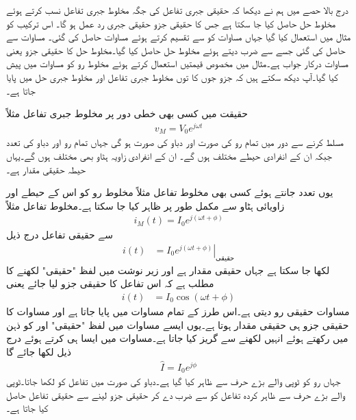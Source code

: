 درج بالا حصے میں ہم نے دیکھا کہ حقیقی جبری تفاعل کی جگہ مخلوط جبری تفاعل نسب کرتے ہوئے مخلوط حل حاصل کیا جا سکتا ہے جس کا حقیقی جزو حقیقی جبری رد عمل ہو گا۔ اس ترکیب کو مثال  میں استعمال کیا گیا جہاں مساوات  کو  سے تقسیم کرتے ہوئے مساوات  حاصل کی گئی۔ مساوات  سے  حاصل کی گئی جسے   سے ضرب دیتے ہوئے مخلوط حل حاصل کیا گیا۔مخلوط حل کا حقیقی جزو یعنی مساوات  درکار جواب ہے۔مثال  میں  مخصوص قیمتیں استعمال کرتے  ہوئے مخلوط رو کو مساوات   میں پیش کیا گیا۔آپ دیکھ سکتے ہیں کہ جزو   جوں کا توں مخلوط جبری تفاعل اور مخلوط جبری حل میں پایا جاتا ہے۔

حقیقت میں کسی بھی خطی دور پر مخلوط جبری تفاعل مثلاً
\begin{align}
v_M=V_0 e^{j \omega t}
\end{align}
مسلط کرنے سے دور میں تمام رو کی صورت  اور دباو کی صورت  ہو گی جہاں تمام رو اور دباو  کی تعدد  جبکہ ان کے انفرادی  حیطے مختلف ہوں گے۔ ان کے انفرادی زاویہ ہٹاو بھی مختلف ہوں گے۔یہاں حیطہ حقیقی مقدار ہے۔

یوں تعدد جانتے ہوئے کسی بھی مخلوط تفاعل مثلاً مخلوط رو کو اس کے حیطے  اور زاویائی ہٹاو  سے مکمل طور پر ظاہر کیا جا سکتا ہے۔مخلوط تفاعل مثلاً 
\begin{align}
i_M(t)=I_0 e^{j(\omega t+\phi)}
\end{align}
سے حقیقی تفاعل درج ذیل
\begin{align}\label{مساوات_بدلتا_حقیقی_رو_الف}
i(t)&=\left. I_0 e^{j(\omega t+\phi)} \right|_{\text{حقیقی}}
\end{align}
لکھا جا سکتا ہے جہاں  حقیقی مقدار ہے اور زیر نوشت میں لفظ "حقیقی" لکھنے کا مطلب ہے کہ اس تفاعل کا حقیقی جزو لیا جائے یعنی
\begin{align}\label{مساوات_بدلتا_حقیقی_رو_ب}
i(t)&=I_0 \cos (\omega t+\phi)
\end{align}
مساوات  حقیقی رو دیتی ہے۔اس طرز کے تمام مساوات میں  پایا جاتا ہے اور مساوات کا حقیقی جزو ہی حقیقی مقدار ہوتا ہے۔یوں ایسے مساوات میں لفظ "حقیقی" اور  کو ذہن میں رکھتے ہوئے انہیں لکھنے سے گریز کیا جاتا ہے۔مساوات  میں ایسا ہی کرتے ہوئے درج ذیل لکھا جائے گا
\begin{align}\label{مساوات_بدلتا_دوری_سمتیہ_الف}
\hat{I}=I_0e^{j\phi}
\end{align}
جہاں رو کو ٹوپی والے بڑے حرف سے ظاہر کیا گیا ہے۔دباو کی صورت میں تفاعل کو  لکھا جاتا۔ٹوپی والے بڑے حرف سے ظاہر کردہ تفاعل کو  سے ضرب دے کر حقیقی جزو لینے سے حقیقی تفاعل حاصل کیا جاتا ہے۔

